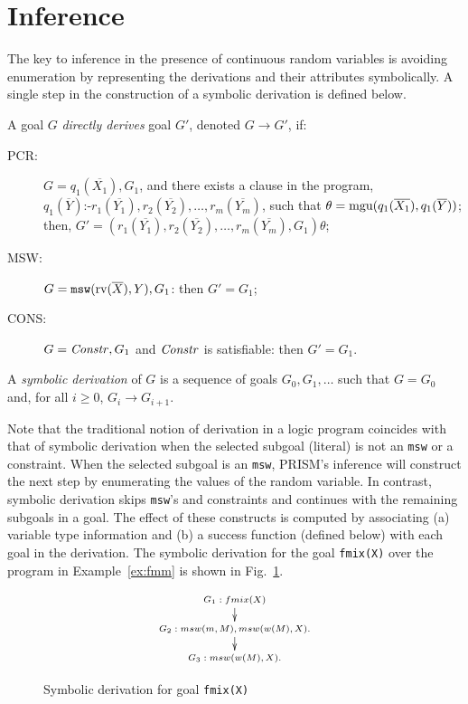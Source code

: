 \section{Inference}
\label{sec:inference}

\newcommand{\marginalize}{\mathbb{M}}
\newcommand{\integrate}{\mathbb{I}}
\newcommand{\project}{\mathbb{P}}


The key to inference in the presence of
continuous random variables is avoiding enumeration by 
representing the derivations and their attributes symbolically.  A single
step in the construction of a symbolic derivation is defined below.

\begin{Def}
A goal $G$ \emph{directly derives}  goal $G'$, denoted $G \rightarrow
G'$,  if:
\begin{description}
\item[PCR:] $G = q_1(\overline{X_1}), G_1$, and there exists a
  clause in the program, $q_1(\overline{Y}) \mbox{:-} r_1(\overline{Y_1}),
  r_2(\overline{Y_2}), \ldots, r_m(\overline{Y_m})$, such that $\theta =
  \mbox{\rm mgu}(q_1(\overline{X_1}), q_1(\overline{Y}))$; then, $G' =
  (r_1(\overline{Y_1}), r_2(\overline{Y_2}), \ldots,
  r_m(\overline{Y_m}), G_1)\theta$; 
\item[MSW:] $G = \mathtt{msw}(\mbox{\rm rv}(\overline{X}), Y), G_1$: then
  $G' = G_1$;
\item[CONS:]$G = \mbox{\it Constr\/}, G_1$ and $\mbox{\it Constr\/}$ is satisfiable: then $G' = G_1$.
\end{description}
A \emph{symbolic derivation} of $G$ is a sequence of goals $G_0, G_1,
\ldots$ such that $G=G_0$ and, for all $i \geq 0$, $G_i \rightarrow G_{i+1}$.
\end{Def}
Note that the traditional notion of derivation in a logic program
coincides with that of symbolic derivation when the selected subgoal
(literal) is not an \texttt{msw} or a constraint. When the selected
subgoal is an \texttt{msw}, PRISM's inference will construct the next
step by enumerating the values of the random variable.  In contrast,
symbolic derivation skips \texttt{msw}'s and constraints and
continues with the remaining subgoals in a goal.  The effect of these
constructs is computed by associating (a) variable type information
and (b) a success function (defined below) with each goal in the
derivation.  The symbolic derivation for the goal \texttt{fmix(X)} over the program
in Example~\ref{ex:fmm} is shown in
Fig.~\ref{fig:fmmderivation}.

\begin{figure}
\centering
\begin{minipage}[t]{1.5in}
\begin{displaymath}
\scriptsize{
  \xymatrix @=10pt {
    G_{1}: fmix(X) \ar[d]  \\
    G_{2}: msw(m,M), msw(w(M), X).  \ar[d]   \\
    G_{3}: msw(w(M), X).  
  }
}
\end{displaymath}
\end{minipage}
\caption{Symbolic derivation for goal \texttt{fmix(X)}}
\label{fig:fmmderivation}
\end{figure}


